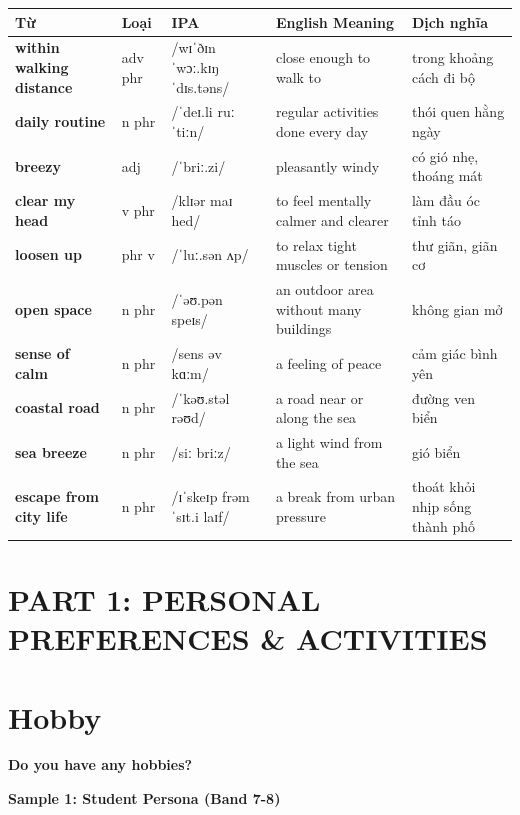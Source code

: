 \vspace{0.8em}
\begin{center}
\renewcommand{\arraystretch}{1.65}
\begin{tabularx}{\textwidth}{|V{0.22\textwidth}|C{0.07\textwidth}|I{0.20\textwidth}|Y|V{0.18\textwidth}|}
\hline
{}
\textbf{Từ} & \textbf{Loại} & \textbf{IPA} & \textbf{English Meaning} & \textbf{Dịch nghĩa} \\
\hline
\textbf{within walking distance} & adv phr & /wɪˈðɪn ˈwɔː.kɪŋ ˈdɪs.təns/ & close enough to walk to & trong khoảng cách đi bộ \\ \hline
\textbf{daily routine} & n phr & /ˈdeɪ.li ruːˈtiːn/ & regular activities done every day & thói quen hằng ngày \\ \hline
\textbf{breezy} & adj & /ˈbriː.zi/ & pleasantly windy & có gió nhẹ, thoáng mát \\ \hline
\textbf{clear my head} & v phr & /klɪər maɪ hed/ & to feel mentally calmer and clearer & làm đầu óc tỉnh táo \\ \hline
\textbf{loosen up} & phr v & /ˈluː.sən ʌp/ & to relax tight muscles or tension & thư giãn, giãn cơ \\ \hline
\textbf{open space} & n phr & /ˈəʊ.pən speɪs/ & an outdoor area without many buildings & không gian mở \\ \hline
\textbf{sense of calm} & n phr & /sens əv kɑːm/ & a feeling of peace & cảm giác bình yên \\ \hline
\textbf{coastal road} & n phr & /ˈkəʊ.stəl rəʊd/ & a road near or along the sea & đường ven biển \\ \hline
\textbf{sea breeze} & n phr & /siː briːz/ & a light wind from the sea & gió biển \\ \hline
\textbf{escape from city life} & n phr & /ɪˈskeɪp frəm ˈsɪt.i laɪf/ & a break from urban pressure & thoát khỏi nhịp sống thành phố \\ \hline
\end{tabularx}
\end{center}

\newpage

\section*{PART 1: PERSONAL PREFERENCES \& ACTIVITIES}

\section{Hobby}
\begin{ieltsquestion}
\textbf{Do you have any hobbies?}
\end{ieltsquestion}
\textbf{Sample 1: Student Persona (Band 7-8)}

